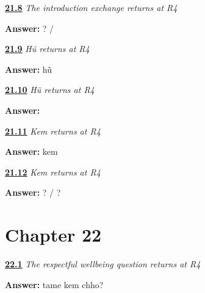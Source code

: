 \noindent\begin{minipage}[t]{\linewidth}
\raggedright
\hyperlink{review-GU-R17-introduction-r4-writing}{\textbf{21.8}} \emph{The introduction exchange returns at R4}\par
\small \textbf{Answer:}    ? /    \par
\end{minipage}\par\medskip

\noindent\begin{minipage}[t]{\linewidth}
\raggedright
\hyperlink{review-GU-R17-hun-r4-listening}{\textbf{21.9}} \emph{Hũ returns at R4}\par
\small \textbf{Answer:} hũ\par
\end{minipage}\par\medskip

\noindent\begin{minipage}[t]{\linewidth}
\raggedright
\hyperlink{review-GU-R17-hun-r4-writing}{\textbf{21.10}} \emph{Hũ returns at R4}\par
\small \textbf{Answer:} \par
\end{minipage}\par\medskip

\noindent\begin{minipage}[t]{\linewidth}
\raggedright
\hyperlink{review-GU-R17-kem-r4-listening}{\textbf{21.11}} \emph{Kem returns at R4}\par
\small \textbf{Answer:} kem\par
\end{minipage}\par\medskip

\noindent\begin{minipage}[t]{\linewidth}
\raggedright
\hyperlink{review-GU-R17-kem-r4-writing}{\textbf{21.12}} \emph{Kem returns at R4}\par
\small \textbf{Answer:}    ? /   ?\par
\end{minipage}\par\medskip

\section*{Chapter 22}

\noindent\begin{minipage}[t]{\linewidth}
\raggedright
\hyperlink{review-GU-R18-how-are-you-r4-listening}{\textbf{22.1}} \emph{The respectful wellbeing question returns at R4}\par
\small \textbf{Answer:} tame kem chho?\par
\end{minipage}\par\medskip

